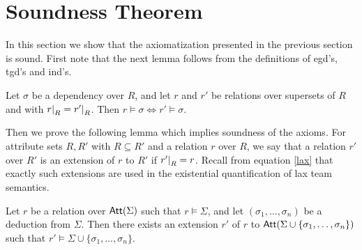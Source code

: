 \documentclass[envcountset]{llncs}
\newcommand{\problemFont}[1]{\protect\ensuremath{\mathsf{#1}}}
\newcommand{\si}{\sigma}
\newcommand{\Si}{\Sigma}
\newcommand{\sub}{\subseteq}
\newcommand{\at}{\problemFont{Att}}
\newcommand\re[2]{{\left.\kern-\nulldelimiterspace #1 \vphantom{|} \right|_{#2} }}
\begin{document}
\section{Soundness Theorem}
In this section we show that the axiomatization presented in the previous section is sound.  First note that the next lemma  follows from the definitions of egd's, tgd's and ind's.
\begin{lemma}\label{clear}
Let $\si $ be a dependency over $R$, and let $r$ and $r'$ be relations over supersets of $R$ and with $\re{r}{R}=\re{r'}{R}$. Then $r\models \si \Leftrightarrow r'\models \si$.
\end{lemma}
Then we prove the following lemma  which implies soundness of the axioms. For attribute sets $R,R'$ with $R\sub R'$ and a relation $r$ over $R$, we say that a relation $r'$ over $R'$ is an extension of $r$ to $R'$ if $\re{r'}{R}= r$. Recall from equation \ref{lax} that exactly such extensions are used in the existential quantification of lax team semantics.
\begin{lemma}\label{soundlem}
Let $r$ be a relation over $\at(\Si)$ such that $r\models \Si$, and  let $(\si_1, \ldots ,\si_n)$ be a deduction from $\Si$. Then  there exists an extension $r'$ of $r$ to $\at(\Si\cup\{\si_1, \ldots ,\si_n\})$ such that $r'\models \Si\cup\{\si_1, \ldots ,\si_n\}$.
\end{lemma}
\end{document}
